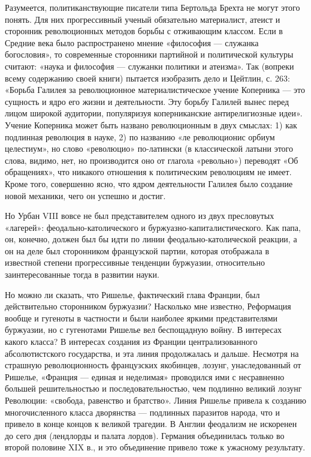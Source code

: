 Разумеется, политиканствующие писатели типа  Бертольда Брехта не могут
этого понять.  Для них  прогрессивный ученый  обязательно материалист,
атеист и сторонник революционных  методов борьбы с отживающим классом.
Если в Средние века было распространено мнение «философия --- служанка
богословия»,  то  современные   сторонники  партийной  и  политической
культуры считают: «наука и философия --- служанки политики и атеизма».
Так (вопреки всему содержанию своей  книги) пытается изобразить дело и
Цейтлин, с.  263: «Борьба Галилея за  революционное материалистическое
учение Коперника --- это сущность и ядро его жизни и деятельности. Эту
борьбу  Галилей  вынес  перед  лицом  широкой  аудитории,  популяризуя
коперниканские  антирелигиозные  идеи».  Учение Коперника  может  быть
названо  революционным  в двух  смыслах:  1)  как подлинная  революция
в  науке,  2)  по  названию «ле  революционис  орбиум  целестиум»,  но
слово  «революцио» по-латински  (в  классической  латыни этого  слова,
видимо, нет, но производится оно  от глагола «револьно») переводят «Об
обращениях»,  что  никакого  отношения к  политическим  революциям  не
имеет.  Кроме того,  совершенно ясно,  что ядром  деятельности Галилея
было создание новой механики, чего он успешно и достиг.

Но Урбан VIII  вовсе не был представителем одного  из двух пресловутых
«лагерей»: феодально-католического и буржуазно-капиталистического. Как
папа, он, конечно, должен был  бы идти по линии феодально-католической
реакции,  а он  на деле  был сторонником  французской партии,  которая
отображала  в  известной  степени прогрессивные  тенденции  буржуазии,
относительно заинтересованные тогда в развитии науки.

Но  можно   ли  сказать,  что  Ришелье,   фактический  глава  Франции,
был  действительно  сторонником  буржуазии?  Насколько  мне  известно,
Реформация   вообще   и  гугеноты   в   частности   и  были   наиболее
яркими  представителями   буржуазии,  но  с  гугенотами   Ришелье  вел
беспощадную  войну. В  интересах какого  класса? В  интересах создания
из  Франции  централизованного   абсолютистского  государства,  и  эта
линия  продолжалась и  дальше.  Несмотря  на страшную  революционность
французских  якобинцев, лозунг,  унаследованный  от Ришелье,  «Франция
---  единая   и  неделимая»  проводился  ими   с  несравненно  большей
решительностью  и  последовательностью,  чем подлинно  великий  лозунг
Революции: «свобода,  равенство и  братство». Линия Ришелье  привела к
созданию  многочисленного класса  дворянства  --- подлинных  паразитов
народа, что  и привело  в конце  концов к  великой трагедии.  В Англии
феодализм  не  искоренен до  сего  дня  (лендлорды и  палата  лордов).
Германия  объединилась  только  во  второй  половине  XIX  в.,  и  это
объединение привело тоже к ужасному результату.

